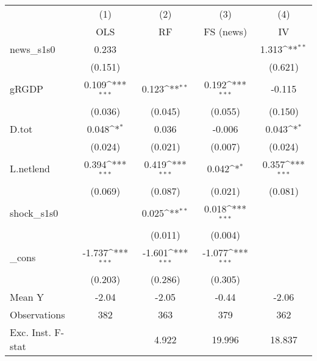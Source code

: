 {
\def\sym#1{\ifmmode^{#1}\else\(^{#1}\)\fi}
\begin{tabular}{l*{4}{c}}
\toprule
            &\multicolumn{1}{c}{(1)}&\multicolumn{1}{c}{(2)}&\multicolumn{1}{c}{(3)}&\multicolumn{1}{c}{(4)}\\
            &\multicolumn{1}{c}{OLS}&\multicolumn{1}{c}{RF}&\multicolumn{1}{c}{FS (news)}&\multicolumn{1}{c}{IV}\\
\midrule
news\_s1s0   &       0.233         &                     &                     &       1.313\sym{**} \\
            &     (0.151)         &                     &                     &     (0.621)         \\
\addlinespace
gRGDP       &       0.109\sym{***}&       0.123\sym{**} &       0.192\sym{***}&      -0.115         \\
            &     (0.036)         &     (0.045)         &     (0.055)         &     (0.150)         \\
\addlinespace
D.tot       &       0.048\sym{*}  &       0.036         &      -0.006         &       0.043\sym{*}  \\
            &     (0.024)         &     (0.021)         &     (0.007)         &     (0.024)         \\
\addlinespace
L.netlend   &       0.394\sym{***}&       0.419\sym{***}&       0.042\sym{*}  &       0.357\sym{***}\\
            &     (0.069)         &     (0.087)         &     (0.021)         &     (0.081)         \\
\addlinespace
shock\_s1s0  &                     &       0.025\sym{**} &       0.018\sym{***}&                     \\
            &                     &     (0.011)         &     (0.004)         &                     \\
\addlinespace
\_cons      &      -1.737\sym{***}&      -1.601\sym{***}&      -1.077\sym{***}&                     \\
            &     (0.203)         &     (0.286)         &     (0.305)         &                     \\
\midrule
Mean Y      &       -2.04         &       -2.05         &       -0.44         &       -2.06         \\
Observations&         382         &         363         &         379         &         362         \\
Exc. Inst. F-stat&                     &       4.922         &      19.996         &      18.837         \\
\bottomrule
\end{tabular}
}
